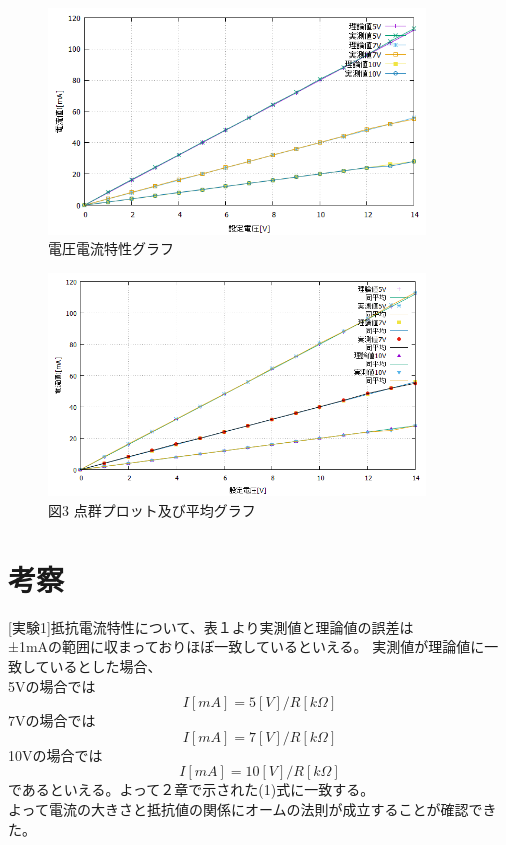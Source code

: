 \documentclass[titlepage]{jarticle}
\begin{document}
\begin{figure}[H]
    \begin{center}
        \includegraphics[width=10cm]{02.png}
        \caption{電圧電流特性グラフ}
    \end{center}
\end{figure}

\begin{figure}[H]
    \begin{center}
        \includegraphics[width=10cm]{03.png}
        \caption{図3 点群プロット及び平均グラフ}
    \end{center}
\end{figure}

\section{考察}
[実験1]抵抗電流特性について、表１より実測値と理論値の誤差は\\
±1mAの範囲に収まっておりほぼ一致しているといえる。
実測値が理論値に一致しているとした場合、\\
5Vの場合では
\begin{equation}
    I[mA]=5[V]/R[kΩ]
\end{equation}
7Vの場合では
\begin{equation}
    I[mA]=7[V]/R[kΩ]
\end{equation}
10Vの場合では
\begin{equation}
    I[mA]=10[V]/R[kΩ]
\end{equation}
であるといえる。よって２章で示された(1)式に一致する。\\
よって電流の大きさと抵抗値の関係にオームの法則が成立することが確認できた。\\
\end{document}
